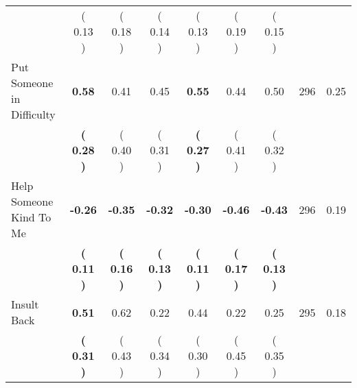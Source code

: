 \begin{tabular}{lcccccccc}
 & (     0.13 ) & (     0.18 ) & (     0.14 ) & (     0.13 ) & (     0.19 ) & (     0.15 ) & \\
Put Someone in Difficulty & \textbf{     0.58} &      0.41 &      0.45 & \textbf{     0.55} &      0.44 &      0.50 & 296 &       0.25 \\ 
 & \textbf{(     0.28 )} & (     0.40 ) & (     0.31 ) & \textbf{(     0.27 )} & (     0.41 ) & (     0.32 ) & \\
Help Someone Kind To Me & \textbf{    -0.26} & \textbf{    -0.35} & \textbf{    -0.32} & \textbf{    -0.30} & \textbf{    -0.46} & \textbf{    -0.43} & 296 &       0.19 \\ 
 & \textbf{(     0.11 )} & \textbf{(     0.16 )} & \textbf{(     0.13 )} & \textbf{(     0.11 )} & \textbf{(     0.17 )} & \textbf{(     0.13 )} & \\
Insult Back & \textbf{     0.51} &      0.62 &      0.22 &      0.44 &      0.22 &      0.25 & 295 &       0.18 \\ 
 & \textbf{(     0.31 )} & (     0.43 ) & (     0.34 ) & (     0.30 ) & (     0.45 ) & (     0.35 ) & \\
\bottomrule
\end{tabular}
